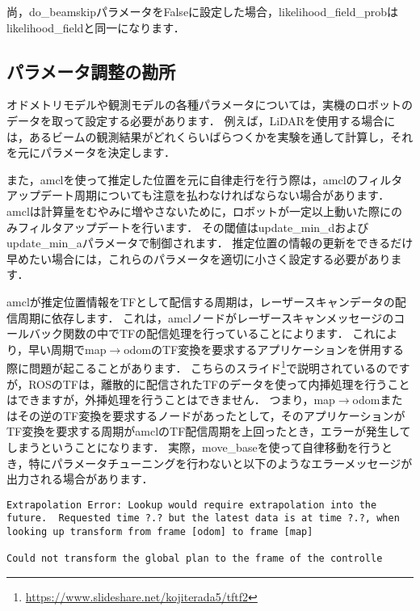 \documentclass[{../../master}]{subfiles}
\begin{document}
尚，\textsf{do\_beamskip}パラメータをFalseに設定した場合，\textsf{likelihood\_field\_prob}は\textsf{likelihood\_field}と同一になります．

\subsection{パラメータ調整の勘所}

オドメトリモデルや観測モデルの各種パラメータについては，実機のロボットのデータを取って設定する必要があります．
例えば，LiDARを使用する場合には，あるビームの観測結果がどれくらいばらつくかを実験を通して計算し，それを元にパラメータを決定します．

また，\textsf{amcl}を使って推定した位置を元に自律走行を行う際は，\textsf{amcl}のフィルタアップデート周期についても注意を払わなければならない場合があります．
\textsf{amcl}は計算量をむやみに増やさないために，ロボットが一定以上動いた際にのみフィルタアップデートを行います．
その閾値は\textsf{update\_min\_d}および\textsf{update\_min\_a}パラメータで制御されます．
推定位置の情報の更新をできるだけ早めたい場合には，これらのパラメータを適切に小さく設定する必要があります．

\textsf{amcl}が推定位置情報をTFとして配信する周期は，レーザースキャンデータの配信周期に依存します．
これは，\textsf{amcl}ノードがレーザースキャンメッセージのコールバック関数の中でTFの配信処理を行っていることによります．
これにより，早い周期で\textsf{map}$\rightarrow$\textsf{odom}のTF変換を要求するアプリケーションを併用する際に問題が起こることがあります．
こちらのスライド\footnote{\url{https://www.slideshare.net/kojiterada5/tftf2}}で説明されているのですが，ROSのTFは，離散的に配信されたTFのデータを使って内挿処理を行うことはできますが，外挿処理を行うことはできません．
つまり，\textsf{map}$\rightarrow$\textsf{odom}またはその逆のTF変換を要求するノードがあったとして，そのアプリケーションがTF変換を要求する周期が\textsf{amcl}のTF配信周期を上回ったとき，エラーが発生してしまうということになります．
実際，\textsf{move\_base}を使って自律移動を行うとき，特にパラメータチューニングを行わないと以下のようなエラーメッセージが出力される場合があります．

\begin{lstlisting}[caption=TF Error Message]
Extrapolation Error: Lookup would require extrapolation into the future.  Requested time ?.? but the latest data is at time ?.?, when looking up transform from frame [odom] to frame [map]

Could not transform the global plan to the frame of the controlle
\end{lstlisting}
\end{document}
